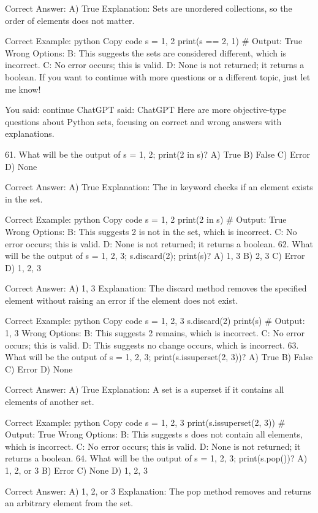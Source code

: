 Correct Answer: A) True
Explanation: Sets are unordered collections, so the order of elements does not matter.

Correct Example:
python
Copy code
s = {1, 2}
print(s == {2, 1})  # Output: True
Wrong Options:
B: This suggests the sets are considered different, which is incorrect.
C: No error occurs; this is valid.
D: None is not returned; it returns a boolean.
If you want to continue with more questions or a different topic, just let me know!






You said:
continue
ChatGPT said:
ChatGPT
Here are more objective-type questions about Python sets, focusing on correct and wrong answers with explanations.

61. What will be the output of s = {1, 2}; print(2 in s)?
A) True
B) False
C) Error
D) None

Correct Answer: A) True
Explanation: The in keyword checks if an element exists in the set.

Correct Example:
python
Copy code
s = {1, 2}
print(2 in s)  # Output: True
Wrong Options:
B: This suggests 2 is not in the set, which is incorrect.
C: No error occurs; this is valid.
D: None is not returned; it returns a boolean.
62. What will be the output of s = {1, 2, 3}; s.discard(2); print(s)?
A) {1, 3}
B) {2, 3}
C) Error
D) {1, 2, 3}

Correct Answer: A) {1, 3}
Explanation: The discard method removes the specified element without raising an error if the element does not exist.

Correct Example:
python
Copy code
s = {1, 2, 3}
s.discard(2)
print(s)  # Output: {1, 3}
Wrong Options:
B: This suggests 2 remains, which is incorrect.
C: No error occurs; this is valid.
D: This suggests no change occurs, which is incorrect.
63. What will be the output of s = {1, 2, 3}; print(s.issuperset({2, 3}))?
A) True
B) False
C) Error
D) None

Correct Answer: A) True
Explanation: A set is a superset if it contains all elements of another set.

Correct Example:
python
Copy code
s = {1, 2, 3}
print(s.issuperset({2, 3}))  # Output: True
Wrong Options:
B: This suggests s does not contain all elements, which is incorrect.
C: No error occurs; this is valid.
D: None is not returned; it returns a boolean.
64. What will be the output of s = {1, 2, 3}; print(s.pop())?
A) 1, 2, or 3
B) Error
C) None
D) {1, 2, 3}

Correct Answer: A) 1, 2, or 3
Explanation: The pop method removes and returns an arbitrary element from the set.

